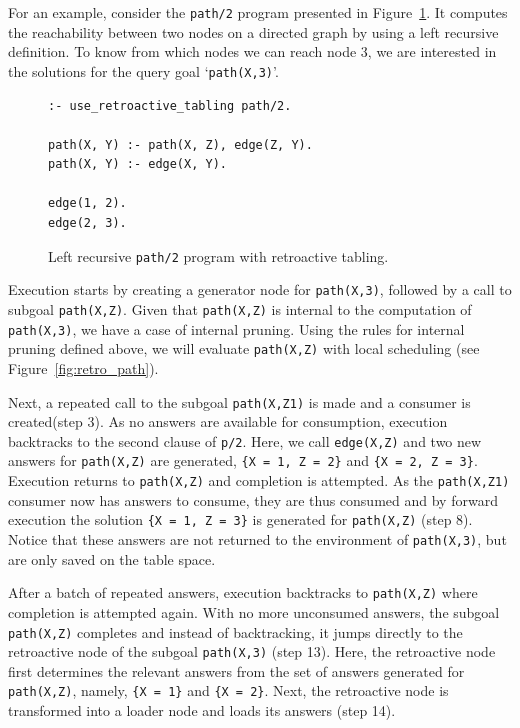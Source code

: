 For an example, consider the \texttt{path/2} program presented in Figure~\ref{fig:retro_path_program}.
It computes the reachability between two nodes on a directed graph by using a left recursive
definition. To know from which nodes we can reach node 3, we are interested in the solutions
for the query goal `\texttt{path(X,3)}'.

\begin{figure}[ht]
\begin{Verbatim}
:- use_retroactive_tabling path/2.

path(X, Y) :- path(X, Z), edge(Z, Y).
path(X, Y) :- edge(X, Y).

edge(1, 2).
edge(2, 3).
\end{Verbatim}
\caption{Left recursive \texttt{path/2} program with retroactive tabling.}
\label{fig:retro_path_program}
\end{figure}

Execution starts by creating a generator node for \texttt{path(X,3)}, followed by a call to
subgoal \texttt{path(X,Z)}. Given that \texttt{path(X,Z)} is internal to the computation of
\texttt{path(X,3)}, we have a case of internal pruning. Using the rules for internal pruning
defined above, we will evaluate \texttt{path(X,Z)} with local scheduling (see Figure~\ref{fig:retro_path}).

Next, a repeated call to the subgoal \texttt{path(X,Z1)} is made and a consumer is created(step 3).
As no answers are available for consumption, execution backtracks to the second clause of \texttt{p/2}.
Here, we call \texttt{edge(X,Z)} and two new answers for \texttt{path(X,Z)} are generated,
\texttt{\{X~=~1,~Z~=~2\}} and \texttt{\{X~=~2,~Z~=~3\}}. Execution returns to \texttt{path(X,Z)} and
completion is attempted. As the \texttt{path(X,Z1)} consumer now has answers to consume, they are
thus consumed and by forward execution the solution \texttt{\{X~=~1,~Z~=~3\}}  is generated for
\texttt{path(X,Z)} (step 8).
Notice that these answers are not returned to the environment of
\texttt{path(X,3)}, but are only saved on the table space.

After a batch of repeated answers, execution backtracks to \texttt{path(X,Z)} where
completion is attempted again. With no more unconsumed answers, the subgoal
\texttt{path(X,Z)} completes and instead of backtracking, it jumps directly to the retroactive node of the subgoal
\texttt{path(X,3)} (step 13).
Here, the retroactive node first determines the relevant answers from the set of
answers generated for \texttt{path(X,Z)}, namely, \texttt{\{X~=~1\}} and \texttt{\{X~=~2\}}. Next,
the retroactive node is transformed into a loader node and loads its answers (step 14).

